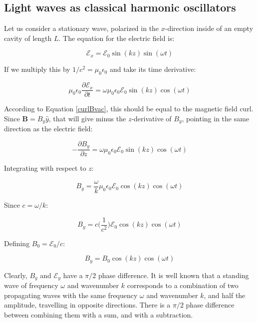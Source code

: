 \documentclass[12pt,a4paper]{report}
\begin{document}
\subsection{Light waves as classical harmonic oscillators}

Let us consider a stationary wave, polarized in the $x$-direction inside of an empty cavity of length $L$. The equation for the electric field is:

\begin{equation}
    \mathcal{E}_x=\mathcal{E}_0\sin(kz)\sin(\omega t)
\end{equation}

If we multiply this by $1/c^2=\mu_0\epsilon_0$ and take its time derivative:

\begin{equation}
    \mu_0\epsilon_0\frac{\partial{\mathcal{E}_x}}{\partial t}=\omega\mu_0\epsilon_0\mathcal{E}_0\sin(kz)\cos(\omega t)
\end{equation}

According to Equation \ref{curlBvac}, this should be equal to the magnetic field curl. Since $\textbf{B}=B_y\hat{y}$, that will give minus the $z$-derivative of $B_y$, pointing in the same direction as the electric field:

\begin{equation}
    -\frac{\partial B_y}{\partial z}=\omega\mu_0\epsilon_0\mathcal{E}_0\sin(kz)\cos(\omega t)
\end{equation}

Integrating with respect to $z$:

\begin{equation}
    B_y=\frac{\omega}{k}\mu_0\epsilon_0\mathcal{E}_0\cos(kz)\cos(\omega t)
\end{equation}

Since $c=\omega/k$:

\begin{equation}
    B_y=c \Big(\frac{1}{c^2}\Big)\mathcal{E}_0\cos(kz)\cos(\omega t)
\end{equation}

Defining $B_0=\mathcal{E}_0/c$:

\begin{equation}
    B_y=B_0\cos(kz)\cos(\omega t)
\end{equation}

Clearly, $B_y$ and $\mathcal{E}_y$ have a $\pi/2$ phase difference. It is well known that a standing wave of frequency $\omega$ and wavenumber $k$ corresponds to a combination of two propagating waves with the same frequency $\omega$ and wavenumber $k$, and half the amplitude, travelling in opposite directions. There is a $\pi/2$ phase difference between combining them with a sum, and with a subtraction.
\end{document}
